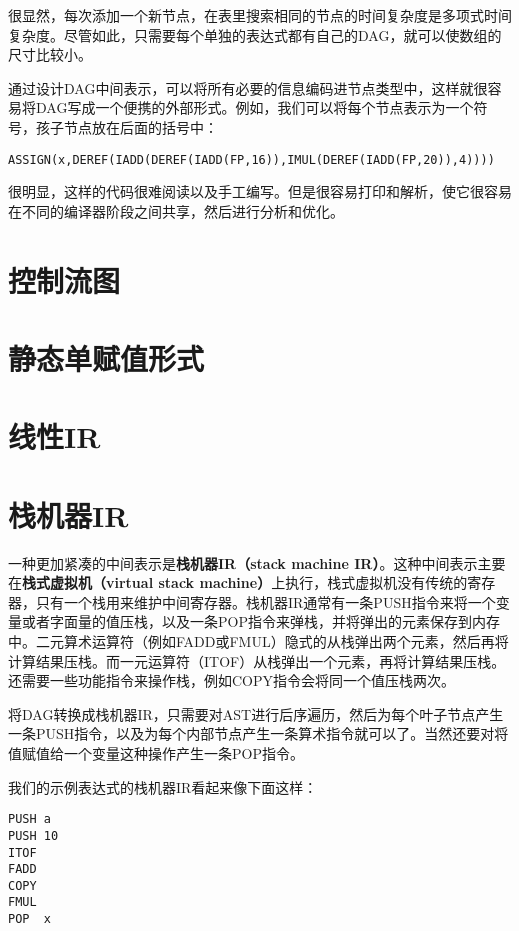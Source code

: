 \documentclass[cn,11pt,chinese]{elegantbook}
\begin{document}
很显然，每次添加一个新节点，在表里搜索相同的节点的时间复杂度是多项式时间复杂度。尽管如此，只需要每个单独的表达式都有自己的DAG，就可以使数组的尺寸比较小。

通过设计DAG中间表示，可以将所有必要的信息编码进节点类型中，这样就很容易将DAG写成一个便携的外部形式。例如，我们可以将每个节点表示为一个符号，孩子节点放在后面的括号中：

\begin{verbatim}
ASSIGN(x,DEREF(IADD(DEREF(IADD(FP,16)),IMUL(DEREF(IADD(FP,20)),4))))
\end{verbatim}

很明显，这样的代码很难阅读以及手工编写。但是很容易打印和解析，使它很容易在不同的编译器阶段之间共享，然后进行分析和优化。

\section{控制流图}

\section{静态单赋值形式}

\section{线性IR}

\section{栈机器IR}

一种更加紧凑的中间表示是\textbf{栈机器IR（stack machine IR）}。这种中间表示主要在\textbf{栈式虚拟机（virtual stack machine）}上执行，栈式虚拟机没有传统的寄存器，只有一个栈用来维护中间寄存器。栈机器IR通常有一条PUSH指令来将一个变量或者字面量的值压栈，以及一条POP指令来弹栈，并将弹出的元素保存到内存中。二元算术运算符（例如FADD或FMUL）隐式的从栈弹出两个元素，然后再将计算结果压栈。而一元运算符（ITOF）从栈弹出一个元素，再将计算结果压栈。还需要一些功能指令来操作栈，例如COPY指令会将同一个值压栈两次。

将DAG转换成栈机器IR，只需要对AST进行后序遍历，然后为每个叶子节点产生一条PUSH指令，以及为每个内部节点产生一条算术指令就可以了。当然还要对将值赋值给一个变量这种操作产生一条POP指令。

我们的示例表达式的栈机器IR看起来像下面这样：

\begin{verbatim}
PUSH a
PUSH 10
ITOF
FADD
COPY
FMUL
POP  x
\end{verbatim}
\end{document}
